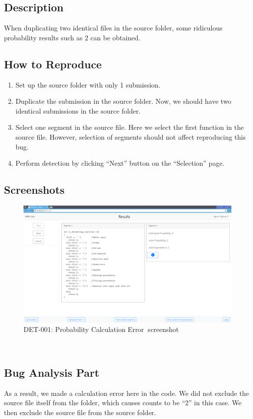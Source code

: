 \documentclass[twoside,a4paper]{refart}
\newcommand{\bugfirst}{DET-001: Probability Calculation Error}
\begin{document}
\subsection*{Description}
When duplicating two identical files in the source folder, some ridiculous probability results such as 2 can be obtained.

\subsection*{How to Reproduce}
\begin{enumerate}
\item Set up the source folder with only 1 submission.
\item Duplicate the submission in the source folder. Now, we should have two identical submissions in the source folder.
\item Select one segment in the source file. Here we select the first function in the source file. However, selection of segments should not affect reproducing this bug.
\item Perform detection by clicking \enquote{Next} button on the \enquote{Selection} page.
\end{enumerate}

\subsection*{Screenshots}
\begin{figure}[!h]
\centering
\includegraphics[width=12cm]{img/bug1.png}
\caption{\bugfirst $\ $ screenshot}
\label{fig:bug1_1}
\end{figure}

$\ $

\subsection{Bug Analysis Part}
As a result, we made a calculation error here in the code. We did not exclude the source file itself from the folder, which causes counts to be \enquote{2} in this case. We then exclude the source file from the source folder.
\end{document}
